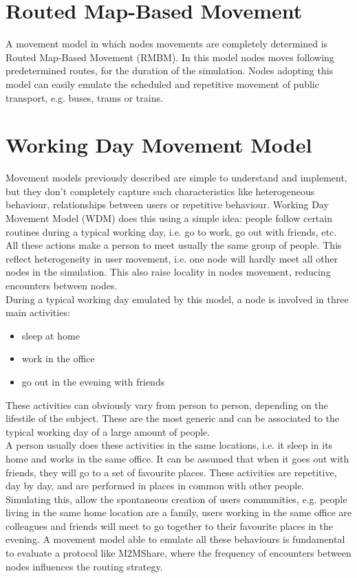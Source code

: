 \section{Routed Map-Based Movement}
A movement model in which nodes movements are completely determined is Routed Map-Based Movement (RMBM). In this model nodes moves following predetermined routes, for the duration of the simulation. Nodes adopting this model can easily emulate the scheduled and repetitive movement of public transport, e.g. buses, trams or trains.


\section{Working Day Movement Model}
\label{descrWDM}
Movement models previously described are simple to understand and implement, but they don't completely capture such characteristics like heterogeneous behaviour, relationships between users or repetitive behaviour. Working Day Movement Model (WDM) \cite{articoloWdm} does this using a simple idea: people follow certain routines during a typical working day, i.e. go to work, go out with friends, etc. 
\\

All these actions make a person to meet usually the same group of people. This reflect heterogeneity in user movement, i.e. one node will hardly meet all other nodes in the simulation. This also raise locality in nodes movement, reducing encounters between nodes.
\\

During a typical working day emulated by this model, a node is involved in three main activities:
\begin{itemize}
\item sleep at home
\item work in the office
\item go out in the evening with friends
\end{itemize}
These activities can obviously vary from person to person, depending on the lifestile of the subject. These are the most generic and can be associated to the typical working day of a large amount of people.
\\

A person usually does these activities in the same locations, i.e. it sleep in its home and works in the same office. It can be assumed that when it goes out with friends, they will go to a set of favourite places. These activities are repetitive, day by day, and are performed in places in common with other people. Simulating this, allow the spontaneous creation of users communities, e.g. people living in the same home location are a family, users working in the same office are colleagues and friends will meet to go together to their favourite places in the evening. A movement model able to emulate all these behaviours is fundamental to evaluate a protocol like M2MShare, where the frequency of encounters between nodes influences the routing strategy.\\

